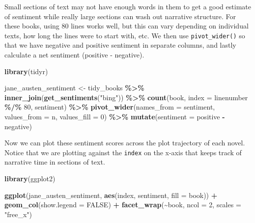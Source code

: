 \documentclass[
]{book}
\newenvironment{Shaded}{\begin{snugshade}}{\end{snugshade}}
\newcommand{\AttributeTok}[1]{\textcolor[rgb]{0.13,0.29,0.53}{#1}}
\newcommand{\ConstantTok}[1]{\textcolor[rgb]{0.56,0.35,0.01}{#1}}
\newcommand{\DecValTok}[1]{\textcolor[rgb]{0.00,0.00,0.81}{#1}}
\newcommand{\FunctionTok}[1]{\textcolor[rgb]{0.13,0.29,0.53}{\textbf{#1}}}
\newcommand{\NormalTok}[1]{#1}
\newcommand{\OtherTok}[1]{\textcolor[rgb]{0.56,0.35,0.01}{#1}}
\newcommand{\SpecialCharTok}[1]{\textcolor[rgb]{0.81,0.36,0.00}{\textbf{#1}}}
\newcommand{\StringTok}[1]{\textcolor[rgb]{0.31,0.60,0.02}{#1}}
\begin{document}
Small sections of text may not have enough words in them to get a good estimate of sentiment while really large sections can wash out narrative structure. For these books, using 80 lines works well, but this can vary depending on individual texts, how long the lines were to start with, etc. We then use \texttt{pivot\_wider()} so that we have negative and positive sentiment in separate columns, and lastly calculate a net sentiment (positive - negative).

\begin{Shaded}
\begin{Highlighting}[]
\FunctionTok{library}\NormalTok{(tidyr)}

\NormalTok{jane\_austen\_sentiment }\OtherTok{\textless{}{-}}\NormalTok{ tidy\_books }\SpecialCharTok{\%\textgreater{}\%}
  \FunctionTok{inner\_join}\NormalTok{(}\FunctionTok{get\_sentiments}\NormalTok{(}\StringTok{"bing"}\NormalTok{)) }\SpecialCharTok{\%\textgreater{}\%}
  \FunctionTok{count}\NormalTok{(book, }\AttributeTok{index =}\NormalTok{ linenumber }\SpecialCharTok{\%/\%} \DecValTok{80}\NormalTok{, sentiment) }\SpecialCharTok{\%\textgreater{}\%}
  \FunctionTok{pivot\_wider}\NormalTok{(}\AttributeTok{names\_from =}\NormalTok{ sentiment, }\AttributeTok{values\_from =}\NormalTok{ n, }\AttributeTok{values\_fill =} \DecValTok{0}\NormalTok{) }\SpecialCharTok{\%\textgreater{}\%} 
  \FunctionTok{mutate}\NormalTok{(}\AttributeTok{sentiment =}\NormalTok{ positive }\SpecialCharTok{{-}}\NormalTok{ negative)}
\end{Highlighting}
\end{Shaded}

Now we can plot these sentiment scores across the plot trajectory of each novel. Notice that we are plotting against the \texttt{index} on the x-axis that keeps track of narrative time in sections of text.

\begin{Shaded}
\begin{Highlighting}[]
\FunctionTok{library}\NormalTok{(ggplot2)}

\FunctionTok{ggplot}\NormalTok{(jane\_austen\_sentiment, }\FunctionTok{aes}\NormalTok{(index, sentiment, }\AttributeTok{fill =}\NormalTok{ book)) }\SpecialCharTok{+}
  \FunctionTok{geom\_col}\NormalTok{(}\AttributeTok{show.legend =} \ConstantTok{FALSE}\NormalTok{) }\SpecialCharTok{+}
  \FunctionTok{facet\_wrap}\NormalTok{(}\SpecialCharTok{\textasciitilde{}}\NormalTok{book, }\AttributeTok{ncol =} \DecValTok{2}\NormalTok{, }\AttributeTok{scales =} \StringTok{"free\_x"}\NormalTok{)}
\end{Highlighting}
\end{Shaded}
\end{document}
